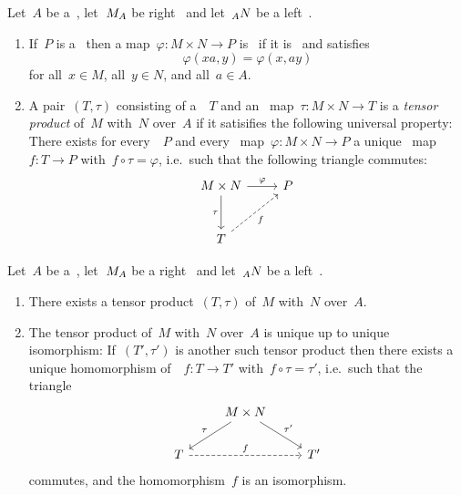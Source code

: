 \begin{definition}
  Let~$A$ be a~{\kalg}, let~$\indmodule{M}[A]$ be right~{} and let~$\indmodule[A]{N}$ be a left~{}.
  \begin{enumerate}
    \item
      If~$P$ is a~{\module{$\kf$}} then a map~$\varphi \colon M \times N \to P$ is~\emph{} if it is~{\kbilin} and satisfies
      \[
          \varphi(xa, y)
        = \varphi(x, ay)
      \]
      for all~$x \in M$, all~$y \in N$, and all~$a \in A$.
    \item
      A pair~$(T,\tau)$ consisting of a~{\module{$\kf$}}~$T$ and an~{} map~$\tau \colon M \times N \to T$ is a \emph{tensor product} of~$M$ with~$N$ over~$A$ if it satisifies the following universal property:
      There exists for every~{\module{$\kf$}}~$P$ and every~{} map~$\varphi \colon M \times N \to P$ a unique~{\klin} map~$f \colon T \to P$ with~$f \circ \tau = \varphi$, i.e.\ such that the following triangle commutes:
      \[
        \begin{tikzcd}[row sep = large]
            M \times N
            \arrow{r}[above]{\varphi}
            \arrow{d}[left]{\tau}
          & P
          \\
            T
            \arrow[dashed]{ur}[below right]{f}
          & {}
        \end{tikzcd}
      \]
  \end{enumerate}
\end{definition}


\begin{lemma}

Let~$A$ be a~{\kalg}, let~$\indmodule{M}[A]$ be a right~{} and let~$\indmodule[A]{N}$ be a left~{}.
  \begin{enumerate}
    \item
      There exists a tensor product~$(T,\tau)$ of~$M$ with~$N$ over~$A$.
    \item
      The tensor product of~$M$ with~$N$ over~$A$ is unique up to unique isomorphism:
      If~$(T',\tau')$ is another such tensor product then there exists a unique homomorphism of~{\modules{$\kf$}}~$f \colon T \to T'$ with~$f \circ \tau = \tau'$, i.e.\ such that the triangle
      \[
        \begin{tikzcd}
            {}
          & M \times N
            \arrow{dl}[above left]{\tau}
            \arrow{dr}[above right]{\tau'}
          & {}
          \\
            T
            \arrow[dashed]{rr}[above]{f}
          & {}
          & T'
        \end{tikzcd}
      \]
      commutes, and the homomorphism~$f$ is an isomorphism.
  \end{enumerate}
\end{lemma}


